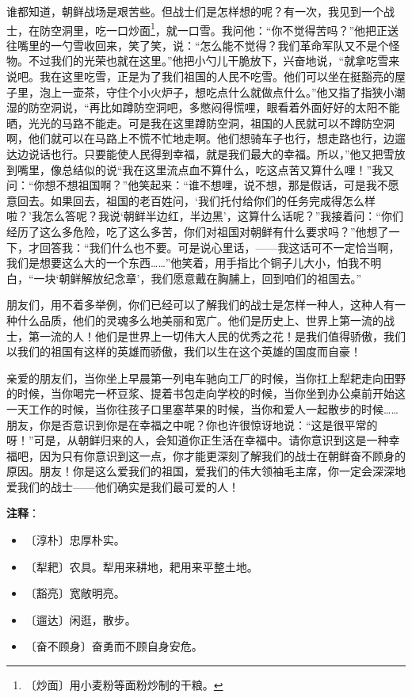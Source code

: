 \documentclass[12pt,UTF-8,openany]{ctexbook}
\begin{document}
\begin{normalsize}
    谁都知道，朝鲜战场是艰苦些。但战士们是怎样想的呢？有一次，我见到一个战士，在防空洞里，吃一口炒面\footnote{〔炒面〕用小麦粉等面粉炒制的干粮。}，就一口雪。我问他：“你不觉得苦吗？”他把正送往嘴里的一勺雪收回来，笑了笑，说：“怎么能不觉得？我们革命军队又不是个怪物。不过我们的光荣也就在这里。”他把小勺儿干脆放下，兴奋地说，“就拿吃雪来说吧。我在这里吃雪，正是为了我们祖国的人民不吃雪。他们可以坐在挺豁亮的屋子里，泡上一壶茶，守住个小火炉子，想吃点什么就做点什么。”他又指了指狭小潮湿的防空洞说，“再比如蹲防空洞吧，多憋闷得慌哩，眼看着外面好好的太阳不能晒，光光的马路不能走。可是我在这里蹲防空洞，祖国的人民就可以不蹲防空洞啊，他们就可以在马路上不慌不忙地走啊。他们想骑车子也行，想走路也行，边遛达边说话也行。只要能使人民得到幸福，就是我们最大的幸福。所以，”他又把雪放到嘴里，像总结似的说“我在这里流点血不算什么，吃这点苦又算什么哩！”我又问：“你想不想祖国啊？”他笑起来：“谁不想哩，说不想，那是假话，可是我不愿意回去。如果回去，祖国的老百姓问，‘我们托付给你们的任务完成得怎么样啦？’我怎么答呢？我说‘朝鲜半边红，半边黑’，这算什么话呢？”我接着问：“你们经历了这么多危险，吃了这么多苦，你们对祖国对朝鲜有什么要求吗？”他想了一下，才回答我：“我们什么也不要。可是说心里话，——我这话可不一定恰当啊，我们是想要这么大的一个东西……”他笑着，用手指比个铜子儿大小，怕我不明白，“一块‘朝鲜解放纪念章’，我们愿意戴在胸脯上，回到咱们的祖国去。”
    
    朋友们，用不着多举例，你们已经可以了解我们的战士是怎样一种人，这种人有一种什么品质，他们的灵魂多么地美丽和宽广。他们是历史上、世界上第一流的战士，第一流的人！他们是世界上一切伟大人民的优秀之花！是我们值得骄傲，我们以我们的祖国有这样的英雄而骄傲，我们以生在这个英雄的国度而自豪！
    
    亲爱的朋友们，当你坐上早晨第一列电车驰向工厂的时候，当你扛上犁耙走向田野的时候，当你喝完一杯豆浆、提着书包走向学校的时候，当你坐到办公桌前开始这一天工作的时候，当你往孩子口里塞苹果的时候，当你和爱人一起散步的时候……朋友，你是否意识到你是在幸福之中呢？你也许很惊讶地说：“这是很平常的呀！”可是，从朝鲜归来的人，会知道你正生活在幸福中。请你意识到这是一种幸福吧，因为只有你意识到这一点，你才能更深刻了解我们的战士在朝鲜奋不顾身的原因。朋友！你是这么爱我们的祖国，爱我们的伟大领袖毛主席，你一定会深深地爱我们的战士——他们确实是我们最可爱的人！
    
\end{normalsize}


\newpage

\textbf{注释}：

\vspace{-1em}

\begin{itemize}
    \setlength\itemsep{-0.2em}
    \item 〔淳朴〕忠厚朴实。
    \item 〔犁耙〕农具。犁用来耕地，耙用来平整土地。
    \item 〔豁亮〕宽敞明亮。
    \item 〔遛达〕闲逛，散步。
    \item 〔奋不顾身〕奋勇而不顾自身安危。
\end{itemize}
\end{document}
